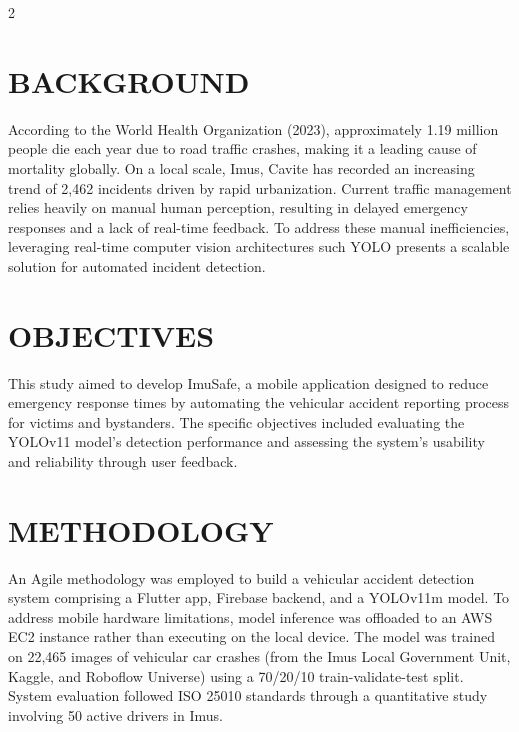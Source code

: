 \documentclass[12pt,a4paper]{article}
\begin{document}
\setlength{\columnsep}{0.25in} 

\begin{multicols}{2}

\section*{BACKGROUND}
According to the World Health Organization (2023), approximately 1.19 million people die each year due to road traffic crashes, making it a leading cause of mortality globally. On a local scale, Imus, Cavite has recorded an increasing trend of 2,462 incidents driven by rapid urbanization. Current traffic management relies heavily on manual human perception, resulting in delayed emergency responses and a lack of real-time feedback. To address these manual inefficiencies, leveraging real-time computer vision architectures such YOLO presents a scalable solution for automated incident detection.

\vspace{1em} 

\section*{OBJECTIVES}
This study aimed to develop ImuSafe, a mobile application designed to reduce emergency response times by automating the vehicular accident reporting process for victims and bystanders. The specific objectives included evaluating the YOLOv11 model's detection performance and assessing the system's usability and reliability through user feedback.

\vspace{1em} 

\section*{METHODOLOGY}
An Agile methodology was employed to build a vehicular accident detection system comprising a Flutter app, Firebase backend, and a YOLOv11m model. To address mobile hardware limitations, model inference was offloaded to an AWS EC2 instance rather than executing on the local device. The model was trained on 22,465 images of vehicular car crashes (from the Imus Local Government Unit, Kaggle, and Roboflow Universe) using a 70/20/10 train-validate-test split. System evaluation followed ISO 25010 standards through a quantitative study involving 50 active drivers in Imus.


\end{multicols}
\end{document}
